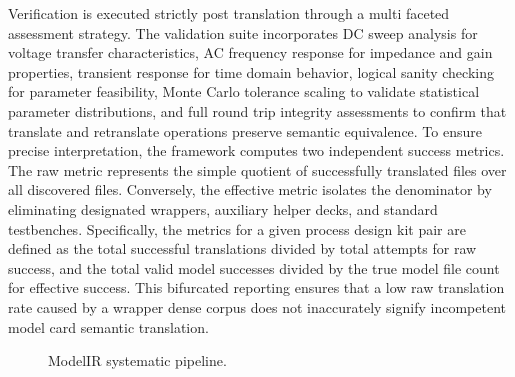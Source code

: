 \documentclass[10pt,twocolumn]{article}
\begin{document}
Verification is executed strictly post translation through a multi faceted assessment strategy. The validation suite incorporates DC sweep analysis for voltage transfer characteristics, AC frequency response for impedance and gain properties, transient response for time domain behavior, logical sanity checking for parameter feasibility, Monte Carlo tolerance scaling to validate statistical parameter distributions, and full round trip integrity assessments to confirm that translate and retranslate operations preserve semantic equivalence. To ensure precise interpretation, the framework computes two independent success metrics. The raw metric represents the simple quotient of successfully translated files over all discovered files. Conversely, the effective metric isolates the denominator by eliminating designated wrappers, auxiliary helper decks, and standard testbenches. Specifically, the metrics for a given process design kit pair are defined as the total successful translations divided by total attempts for raw success, and the total valid model successes divided by the true model file count for effective success. This bifurcated reporting ensures that a low raw translation rate caused by a wrapper dense corpus does not inaccurately signify incompetent model card semantic translation.

\begin{figure}[t]
\centering
{}
\caption{ModelIR systematic pipeline.}
\label{fig:flow}
\end{figure}
\end{document}
